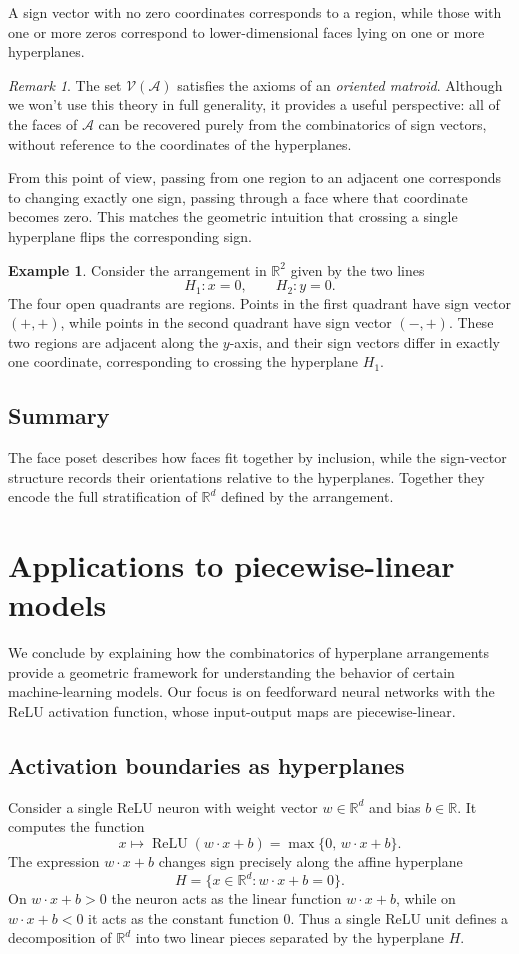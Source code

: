 \documentclass[12pt]{amsart}
\theoremstyle{plain}
\theoremstyle{definition}
\newtheorem{example}{Example}[section]
\theoremstyle{remark}
\newtheorem{remark}{Remark}[section]
\newcommand{\R}{\mathbb{R}}
\newcommand{\A}{\mathcal{A}}
\newcommand{\V}{\mathcal{V}}
\begin{document}
A sign vector with no zero coordinates corresponds to a region, while those with one or more zeros correspond to lower-dimensional faces lying on one or more hyperplanes.

\begin{remark}
The set $\V(\A)$ satisfies the axioms of an \emph{oriented matroid}. Although we won't use this theory in full generality, it provides a useful perspective: all of the faces of $\A$ can be recovered purely from the combinatorics of sign vectors, without reference to the coordinates of the hyperplanes.
\end{remark}

From this point of view, passing from one region to an adjacent one corresponds to changing exactly one sign, passing through a face where that coordinate becomes zero. This matches the geometric intuition that crossing a single hyperplane flips the corresponding sign.

\begin{example}
Consider the arrangement in $\R^2$ given by the two lines
\[
H_1 : x = 0, \qquad H_2 : y = 0.
\]
The four open quadrants are regions. Points in the first quadrant have sign vector $(+,+)$, while points in the second quadrant have sign vector $(-,+)$. These two regions are adjacent along the $y$-axis, and their sign vectors differ in exactly one coordinate, corresponding to crossing the hyperplane $H_1$.
\end{example}

\subsection{Summary}
The face poset describes how faces fit together by inclusion, while the sign-vector structure records their orientations relative to the hyperplanes. Together they encode the full stratification of $\R^d$ defined by the arrangement.

\section{Applications to piecewise-linear models}
We conclude by explaining how the combinatorics of hyperplane arrangements provide a geometric framework for understanding the behavior of certain machine-learning models. Our focus is on feedforward neural networks with the ReLU activation function, whose input-output maps are piecewise-linear.

\subsection{Activation boundaries as hyperplanes}
Consider a single ReLU neuron with weight vector $w \in \R^d$ and bias $b \in \R$. It computes the function
\[
x \mapsto \operatorname{ReLU}(w \cdot x + b) = \max\{ 0,\, w \cdot x + b \}.
\]
The expression $w \cdot x + b$ changes sign precisely along the affine hyperplane
\[
H = \{x \in \R^d : w \cdot x + b = 0\}.
\]
On $w \cdot x + b > 0$ the neuron acts as the linear function $w \cdot x + b$, while on $w \cdot x + b < 0$ it acts as the constant function $0$. Thus a single ReLU unit defines a decomposition of $\R^d$ into two linear pieces separated by the hyperplane $H$.
\end{document}
